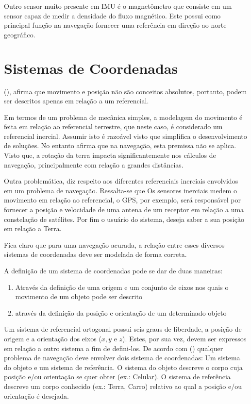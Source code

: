 Outro sensor muito presente em IMU é o magnetômetro que consiste em um sensor capaz de medir a densidade do fluxo magnético. Este possui como principal função na navegação fornecer uma referência em direção ao norte geográfico.

\section{Sistemas de Coordenadas}

\citeauthor*{kovalevsky2012reference}(\citeyear{kovalevsky2012reference}), afirma que movimento e posição não são conceitos absolutos, portanto, podem ser descritos apenas em relação a um referencial.

Em termos de um problema de mecânica simples, a modelagem do movimento é feita em relação ao referencial terrestre, que neste caso, é considerado um referencial inercial. Assumir isto é razoável visto que simplifica o desenvolvimento de soluções. No entanto \citeauthor{mori2013uso} afirma que na navegação, esta premissa não se aplica. Visto que, a rotação da terra impacta significantemente nos cálculos de navegação, principalmente com relação a grandes distâncias.

Outra problemática, diz respeito aos diferentes referenciais inerciais envolvidos em um problema de navegação. Ressalta-se que Os sensores inerciais medem o movimento em relação ao referencial, o GPS, por exemplo, será responsável por fornecer a posição e velocidade de uma antena de um receptor em relação a uma constelação de satélites. Por fim o usuário do sistema, deseja saber a sua posição em relação a Terra. 

Fica claro que para uma navegação acurada, a relação entre esses diversos sistemas de coordenadas deve ser modelada de forma correta.

A definição de um sistema de coordenadas pode se dar de duas maneiras\citep{groves2008principles}:

\begin{enumerate}
    \item Através da definição de uma origem e um conjunto de eixos nos quais o movimento de um objeto pode ser descrito
    \item através da definição da posição e orientação de um determinado objeto
\end{enumerate}{}

Um sistema de referencial ortogonal possui seis graus de liberdade, a posição de origem e a orientação dos eixos ($x, y$ e $z$). Estes, por sua vez, devem ser expressos em relação a outro sistema a fim de defini-los. De acordo com \citeauthor{groves2008principles} (\citeyear{groves2008principles}) qualquer problema de navegação deve envolver dois sistema de coordenadas: Um sistema do objeto e um sistema de referência. O sistema do objeto descreve o corpo cuja posição e/ou orientação se quer obter (ex.: Celular). O sistema de referência descreve um corpo conhecido (ex.: Terra, Carro) relativo ao qual a posição e/ou orientação é desejada.

